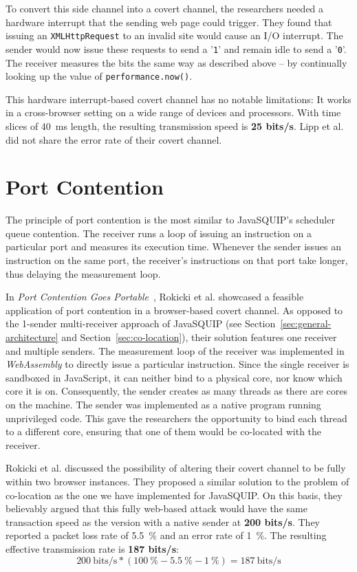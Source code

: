 \documentclass[11pt,
  titlepage=false,
  parskip=half,      %
]{scrreprt}
\begin{document}
To convert this side channel into a covert channel,
the researchers needed a hardware interrupt that the sending web page could trigger.
They found that issuing an \texttt{XMLHttpRequest} to an invalid site would cause an I/O interrupt.
The sender would now issue these requests to send a '\texttt{1}' and remain idle to send a '\texttt{0}'.
The receiver measures the bits the same way as described above --
by continually looking up the value of \texttt{performance.now()}.

This hardware interrupt-based covert channel has no notable limitations:
It works in a cross-browser setting on a wide range of devices and processors.
With time slices of 40~ms length, the resulting transmission speed is \textbf{25 bits/s}.
Lipp et al. did not share the error rate of their covert channel.

\section{Port Contention}
The principle of port contention is the most similar to JavaSQUIP's scheduler queue contention.
The receiver runs a loop of issuing an instruction on a particular port and measures its execution time.
Whenever the sender issues an instruction on the same port, the receiver's instructions on that port take longer,
thus delaying the measurement loop.

In \textit{Port Contention Goes Portable}~\cite{Rokicki2022webport},
Rokicki et al. showcased a feasible application of port contention in a browser-based covert channel.
As opposed to the 1-sender multi-receiver approach of JavaSQUIP (see Section~\ref{sec:general-architecture} and Section~\ref{sec:co-location}),
their solution features one receiver and multiple senders.
The measurement loop of the receiver was implemented in \textit{WebAssembly} to directly issue a particular instruction.
Since the single receiver is sandboxed in JavaScript, it can neither bind to a physical core, nor know which core it is on.
Consequently, the sender creates as many threads as there are cores on the machine.
The sender was implemented as a native program running unprivileged code.
This gave the researchers the opportunity to bind each thread to a different core,
ensuring that one of them would be co-located with the receiver.

Rokicki et al. discussed the possibility of altering their covert channel to be fully within two browser instances.
They proposed a similar solution to the problem of co-location as the one we have implemented for JavaSQUIP.
On this basis, they believably argued that this fully web-based attack would have the same transaction speed as the version
with a native sender at \textbf{200 bits/s}.
They reported a packet loss rate of 5.5~\% and an error rate of 1~\%.
The resulting effective transmission rate is \textbf{187 bits/s}:
\[200~\text{bits/s} * (100~\% - 5.5~\% - 1~\%) = 187~\text{bits/s}\]
\end{document}
